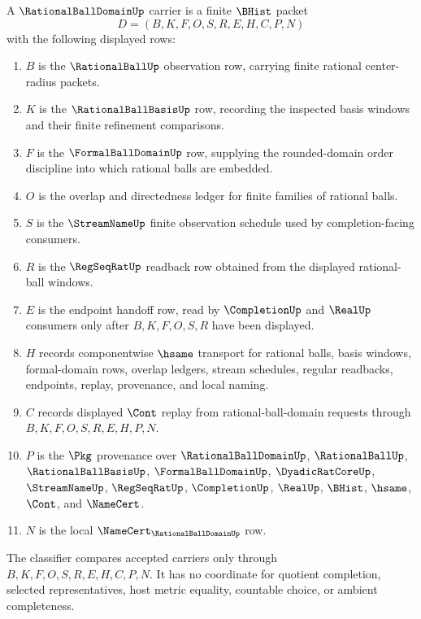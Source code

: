\begin{definition}\label{def:rational-ball-domain-carrier}
A $\RationalBallDomainUp$ carrier is a finite $\BHist$ packet
$$
D=(B,K,F,O,S,R,E,H,C,P,N)
$$
with the following displayed rows:
\begin{enumerate}
\item $B$ is the $\RationalBallUp$ observation row, carrying finite rational center-radius packets.
\item $K$ is the $\RationalBallBasisUp$ row, recording the inspected basis windows and their finite refinement comparisons.
\item $F$ is the $\FormalBallDomainUp$ row, supplying the rounded-domain order discipline into which rational balls are embedded.
\item $O$ is the overlap and directedness ledger for finite families of rational balls.
\item $S$ is the $\StreamNameUp$ finite observation schedule used by completion-facing consumers.
\item $R$ is the $\RegSeqRatUp$ readback row obtained from the displayed rational-ball windows.
\item $E$ is the endpoint handoff row, read by $\CompletionUp$ and $\RealUp$ consumers only after $B,K,F,O,S,R$ have been displayed.
\item $H$ records componentwise $\hsame$ transport for rational balls, basis windows, formal-domain rows, overlap ledgers, stream schedules, regular readbacks, endpoints, replay, provenance, and local naming.
\item $C$ records displayed $\Cont$ replay from rational-ball-domain requests through $B,K,F,O,S,R,E,H,P,N$.
\item $P$ is the $\Pkg$ provenance over $\RationalBallDomainUp$, $\RationalBallUp$, $\RationalBallBasisUp$, $\FormalBallDomainUp$, $\DyadicRatCoreUp$, $\StreamNameUp$, $\RegSeqRatUp$, $\CompletionUp$, $\RealUp$, $\BHist$, $\hsame$, $\Cont$, and $\NameCert$.
\item $N$ is the local $\NameCert_{\RationalBallDomainUp}$ row.
\end{enumerate}
The classifier compares accepted carriers only through $B,K,F,O,S,R,E,H,C,P,N$. It has no coordinate for quotient completion, selected representatives, host metric equality, countable choice, or ambient completeness.
\end{definition}

